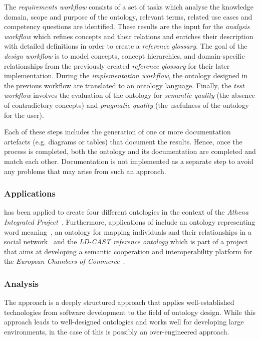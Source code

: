 The \emph{requirements workflow} consists of a set of tasks which analyse the knowledge domain, scope and purpose of the ontology, relevant terms, related use cases and competency questions are identified. These results are the input for the \emph{analysis workflow} which refines concepts and their relations and enriches their description with detailed definitions in order to create a \emph{reference glossary}. The goal of the \emph{design workflow} is to model concepts, concept hierarchies, and domain-specific relationships from the previously created \emph{reference glossary} for their later implementation.
During the \emph{implementation workflow}, the ontology designed in the previous workflow are translated to an ontology language. Finally, the \emph{test workflow} involves the evaluation of the ontology for \emph{semantic quality} (the absence of contradictory concepts) and \emph{pragmatic quality} (the usefulness of the ontology for the user).

Each of these steps includes the generation of one or more documentation artefacts (e.g. diagrams or tables) that document the results. Hence, once the  process is completed, both the ontology and its documentation are completed and match each other. Documentation is not implemented as a separate step to avoid any problems that may arise from such an approach.

\subsubsection{Applications}

 has been applied to create four different ontologies in the context of the \emph{Athena Integrated Project}~\cite{AthenaProject}. Furthermore, applications of  include an ontology representing word meaning~\cite{upon_example1}, an ontology for mapping individuals and their relationships in a social network~\cite{upon_example2} and the \emph{LD-CAST reference ontology} which is part of a project that aims at developing a semantic cooperation and interoperability platform for the \emph{European Chambers of Commerce}~\cite{upon_example3,ld_cast}.

\subsubsection{Analysis}

The  approach is a deeply structured approach that applies well-established technologies from software development to the field of ontology design. While this approach leads to well-designed ontologies and works well for developing large environments, in the case of \smarthomeweather this is possibly an over-engineered approach.

